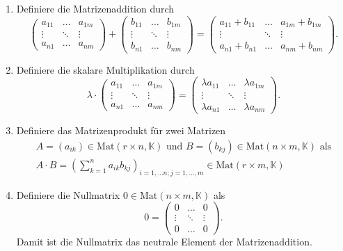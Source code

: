 \documentclass[a4paper,12pt]{article}
\numberwithin{equation}{section}
\begin{document}
\begin{enumerate}[label=(\alph*)]
        \item Definiere die Matrizenaddition durch
                \[ 
                        \left(\begin{matrix}
                                        a_{11}&\hdots &a_{1m}\\\vdots&\ddots&\vdots\\a_{n1}&\hdots &a_{nm}
                        \end{matrix}\right)+\left(\begin{matrix}
                                        b_{11}&\hdots &b_{1m}\\\vdots&\ddots&\vdots\\b_{n1}&\hdots &b_{nm}
                        \end{matrix}\right)=\left(\begin{matrix}
                                        a_{11}+b_{11}&\hdots &a_{1m}+b_{1m}\\\vdots&\ddots&\vdots\\a_{n1}+b_{n1}&\hdots &a_{nm}+b_{nm}
                        \end{matrix}\right)
                .\] 
        \item Definiere die skalare Multiplikation durch
                \[ 
                        \lambda \cdot \left(\begin{matrix}
                                        a_{11}&\hdots &a_{1m}\\\vdots&\ddots&\vdots\\a_{n1}&\hdots &a_{nm}
                        \end{matrix}\right)=\left(\begin{matrix}
                                        \lambda a_{11}&\hdots &\lambda a_{1m}\\\vdots&\ddots&\vdots\\\lambda a_{n1}&\hdots &\lambda a_{nm}
                        \end{matrix}\right)
                .\] 
        \item Definiere das Matrizenprodukt für zwei Matrizen
                \begin{gather*}
                        A=\left(a_{ik}\right) \in \text{Mat}\left(r\times n,\mathbb{K}\right) \text{ und }B=\left(b_{kj}\right) \in \text{Mat}\left(n\times m,\mathbb{K}\right) \text{ als}\\
                A\cdot B=\left(\sum_{k=1}^{n}a_{ik}b_{kj}\right)_{i=1,\hdots n;j=1,\hdots ,m} \in \text{Mat}\left(r\times m,\mathbb{K}\right)
                \end{gather*}
        \item Definiere die Nullmatrix $0 \in \text{Mat}\left(n\times m,\mathbb{K}\right)$ als
                \[ 
                        0=\left(\begin{matrix}
                                        0&\hdots &0\\\vdots&\ddots&\vdots\\0&\hdots &0
                        \end{matrix}\right)
                .\] 
                Damit ist die Nullmatrix das neutrale Element der Matrizenaddition.
\end{enumerate}
\end{document}
